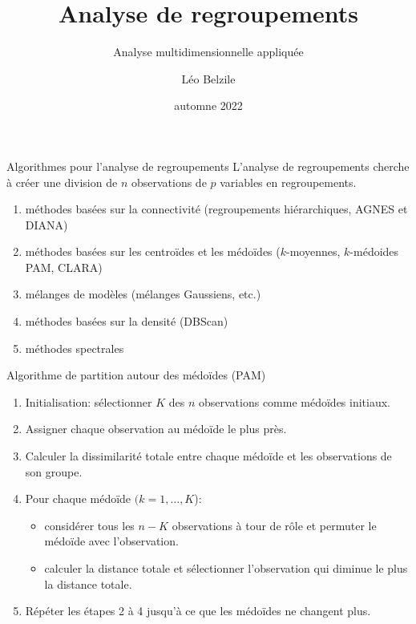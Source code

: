 \documentclass[
  ignorenonframetext,
]{beamer}
\title{Analyse de regroupements}
\subtitle{Analyse multidimensionnelle appliquée}
\author{Léo Belzile}
\date{automne 2022}
\institute{HEC Montréal}
\providecommand{\tightlist}{%
  \setlength{\itemsep}{0pt}\setlength{\parskip}{0pt}}\usepackage{longtable,booktabs,array}
\begin{document}
\frame{\titlepage}
\ifdefined\Shaded\renewenvironment{Shaded}{\begin{tcolorbox}[frame hidden, boxrule=0pt, breakable, enhanced, borderline west={3pt}{0pt}{shadecolor}, interior hidden, sharp corners]}{\end{tcolorbox}}\fi

\begin{frame}{Algorithmes pour l'analyse de regroupements}
\protect\hypertarget{algorithmes-pour-lanalyse-de-regroupements}{}
L'analyse de regroupements cherche à créer une division de \(n\)
observations de \(p\) variables en regroupements.

\begin{enumerate}
\tightlist
\item
  méthodes basées sur la connectivité (regroupements hiérarchiques,
  AGNES et DIANA)
\item
  méthodes basées sur les centroïdes et les médoïdes (\(k\)-moyennes,
  \(k\)-médoides PAM, CLARA)
\item
  mélanges de modèles (mélanges Gaussiens, etc.)
\item
  méthodes basées sur la densité (DBScan)
\item
  méthodes spectrales
\end{enumerate}
\end{frame}

\begin{frame}{Algorithme de partition autour des médoïdes (PAM)}
\protect\hypertarget{algorithme-de-partition-autour-des-muxe9douxefdes-pam}{}
\begin{enumerate}
\tightlist
\item
  Initialisation: sélectionner \(K\) des \(n\) observations comme
  médoïdes initiaux.
\item
  Assigner chaque observation au médoïde le plus près.
\item
  Calculer la dissimilarité totale entre chaque médoïde et les
  observations de son groupe.
\item
  Pour chaque médoïde \((k=1, \ldots, K\)):

  \begin{itemize}
  \tightlist
  \item
    considérer tous les \(n-K\) observations à tour de rôle et permuter
    le médoïde avec l'observation.\\
  \item
    calculer la distance totale et sélectionner l'observation qui
    diminue le plus la distance totale.
  \end{itemize}
\item
  Répéter les étapes 2 à 4 jusqu'à ce que les médoïdes ne changent plus.
\end{enumerate}
\end{frame}
\end{document}
